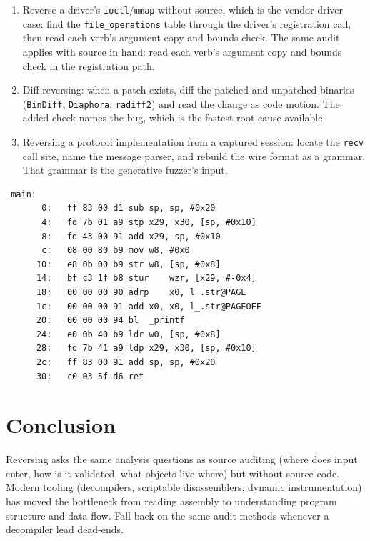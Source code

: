 \documentclass[12pt]{Training}
\begin{document}
\begin{enumerate}
\begin{enumerate}
        \item The specific exercise is this module's own target: \lstinline{checks.c} in \lstinline{binary_re/targets/} is small enough to reverse by hand and layered enough to teach the triage order (magic, length, checksum, then the bug).
    \end{enumerate}
    \item Reverse a driver's \lstinline{ioctl}/\lstinline{mmap} without source, which is the vendor-driver case: find the \lstinline{file_operations} table through the driver's registration call, then read each verb's argument copy and bounds check. The same audit applies with source in hand: read each verb's argument copy and bounds check in the registration path.
    \item Diff reversing: when a patch exists, diff the patched and unpatched binaries (\lstinline{BinDiff}, \lstinline{Diaphora}, \lstinline{radiff2}) and read the change as code motion. The added check names the bug, which is the fastest root cause available.
    \item Reversing a protocol implementation from a captured session: locate the \lstinline{recv} call site, name the message parser, and rebuild the wire format as a grammar. That grammar is the generative fuzzer's input.
\end{enumerate}

\begin{sectionbox}
\begin{lstlisting}[language={[x86masm]Assembler}, caption={ARM64 slice of \texttt{hello.c} at -O0 (objdump -d)}]
_main:
       0:	ff 83 00 d1	sub	sp, sp, #0x20
       4:	fd 7b 01 a9	stp	x29, x30, [sp, #0x10]
       8:	fd 43 00 91	add	x29, sp, #0x10
       c:	08 00 80 b9	mov	w8, #0x0
      10:	e8 0b 00 b9	str	w8, [sp, #0x8]
      14:	bf c3 1f b8	stur	wzr, [x29, #-0x4]
      18:	00 00 00 90	adrp	x0, l_.str@PAGE
      1c:	00 00 00 91	add	x0, x0, l_.str@PAGEOFF
      20:	00 00 00 94	bl	_printf
      24:	e0 0b 40 b9	ldr	w0, [sp, #0x8]
      28:	fd 7b 41 a9	ldp	x29, x30, [sp, #0x10]
      2c:	ff 83 00 91	add	sp, sp, #0x20
      30:	c0 03 5f d6	ret
\end{lstlisting}
\end{sectionbox}

\section*{Conclusion}
Reversing asks the same analysis questions as source auditing (where does input enter, how is it validated, what objects live where) but without source code. Modern tooling (decompilers, scriptable disassemblers, dynamic instrumentation) has moved the bottleneck from reading assembly to understanding program structure and data flow. Fall back on the same audit methods whenever a decompiler lead dead-ends.
\end{document}
